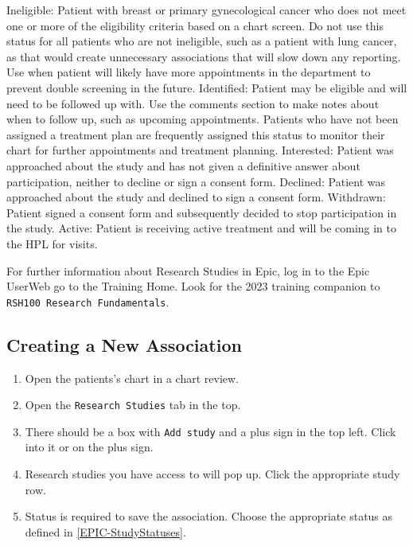 \documentclass[
]{book}
\providecommand{\tightlist}{%
  \setlength{\itemsep}{0pt}\setlength{\parskip}{0pt}}
\begin{document}
Ineligible:
Patient with breast or primary gynecological cancer who does not meet one or more of the eligibility criteria based on a chart screen. Do not use this status for all patients who are not ineligible, such as a patient with lung cancer, as that would create unnecessary associations that will slow down any reporting. Use when patient will likely have more appointments in the department to prevent double screening in the future.
Identified:
Patient may be eligible and will need to be followed up with. Use the comments section to make notes about when to follow up, such as upcoming appointments. Patients who have not been assigned a treatment plan are frequently assigned this status to monitor their chart for further appointments and treatment planning.
Interested:
Patient was approached about the study and has not given a definitive answer about participation, neither to decline or sign a consent form.
Declined:
Patient was approached about the study and declined to sign a consent form.
Withdrawn:
Patient signed a consent form and subsequently decided to stop participation in the study.
Active:
Patient is receiving active treatment and will be coming in to the HPL for visits.

For further information about Research Studies in Epic, log in to the Epic UserWeb go to the Training Home. Look for the 2023 training companion to \texttt{RSH100\ Research\ Fundamentals}.

\hypertarget{EPIC-NewStudyAssociation}{%
\subsection{Creating a New Association}\label{EPIC-NewStudyAssociation}}

\begin{enumerate}
\def\labelenumi{\arabic{enumi}.}
\tightlist
\item
  Open the patients's chart in a chart review.
\item
  Open the \texttt{Research\ Studies} tab in the top.
\item
  There should be a box with \texttt{Add\ study} and a plus sign in the top left. Click into it or on the plus sign.
\item
  Research studies you have access to will pop up. Click the appropriate study row.
\item
  Status is required to save the association. Choose the appropriate status as defined in \ref{EPIC-StudyStatuses}.
\end{enumerate}
\end{document}
